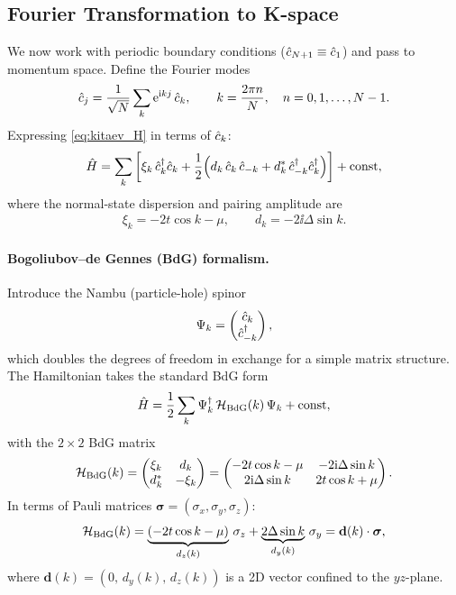 \subsection{Fourier Transformation to K-space}
\label{sec:fourier}

We now work with periodic boundary conditions ($\hat{c}_{N+1} \equiv \hat{c}_1$) and pass to momentum space. Define the Fourier modes
\begin{align}
    \hat{c}_j = \frac{1}{\sqrt{N}}\sum_{k}\mathrm{e}^{\mathrm{i} kj}\,\hat{c}_k, \qquad
    k = \frac{2\pi n}{N},\quad n = 0,1,\ldots,N-1.
\end{align}
Expressing \eqref{eq:kitaev_H} in terms of $\hat{c}_k$:
\begin{align}
    \hat{H} = \sum_k\left[\xi_k\,\hat{c}_k^{\dag}\hat{c}_k
    + \frac{1}{2}\!\left(d_k\,\hat{c}_k\,\hat{c}_{-k}
    + d_k^{*}\,\hat{c}_{-k}^{\dag}\hat{c}_k^{\dag}\right)\right] + \text{const},
\end{align}
where the normal-state dispersion and pairing amplitude are
\begin{align}
    \xi_k = -2t\cos k - \mu, \qquad d_k = -2\ii\Delta\sin k.
    \label{eq:xi_d}
\end{align}

\paragraph{Bogoliubov--de Gennes (BdG) formalism.}
Introduce the Nambu (particle-hole) spinor
\begin{align}
    \Psi_k = \begin{pmatrix}\hat{c}_k \\ \hat{c}_{-k}^{\dag}\end{pmatrix},
\end{align}
which doubles the degrees of freedom in exchange for a simple matrix structure. The Hamiltonian takes the standard BdG form
\begin{align}
    \hat{H} = \frac{1}{2}\sum_k\Psi_k^{\dag}\,\mathcal{H}_{\rm BdG}(k)\,\Psi_k + \text{const},
    \label{eq:H_BdG}
\end{align}
with the $2\times 2$ BdG matrix
\begin{align}
    \mathcal{H}_{\rm BdG}(k)
    = \begin{pmatrix} \xi_k & d_k \\ d_k^{*} & -\xi_k \end{pmatrix}
    = \begin{pmatrix} -2t\cos k - \mu & -2\mathrm{i}\Delta\sin k \\ 2\mathrm{i}\Delta\sin k & 2t\cos k+\mu \end{pmatrix}.
    \label{eq:BdG_matrix}
\end{align}
In terms of Pauli matrices $\boldsymbol{\sigma} = (\sigma_x,\sigma_y,\sigma_z)$:
\begin{align}
    \mathcal{H}_{\rm BdG}(k) = \underbrace{(-2t\cos k - \mu)}_{d_z(k)}\,\sigma_z
    + \underbrace{2\Delta\sin k}_{d_y(k)}\,\sigma_y
    = \mathbf{d}(k)\cdot\boldsymbol{\sigma},
    \label{eq:BdG_dvec}
\end{align}
where $\mathbf{d}(k) = (0,\,d_y(k),\,d_z(k))$ is a 2D vector confined to the $yz$-plane.

